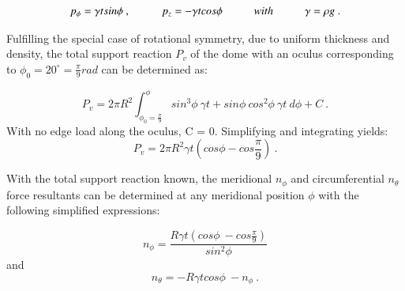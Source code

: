 \begin{equation} 
p_\phi = \gamma t sin\phi\ ,
\hspace{10mm}
p_z = -\gamma t cos\phi
\hspace{10mm}
with
\hspace{10mm}
\gamma = \rho g
\label{eqapp3_1}\ .
\end{equation}

Fulfilling the special case of rotational symmetry, due to uniform thickness and density, the total support reaction $P_v$ of the dome with an oculus corresponding to $\phi_0 = 20^{\circ} = \frac{\pi}{9} rad$ can be determined as:

\begin{equation} 
P_v = 2\pi R^2 \int_{\phi_0 = \frac{\pi}{9}}^{\phi}
sin^3 \phi \ \gamma t + sin \phi \ cos^2 \phi \ \gamma t
\ d\phi + C
\label{eqapp3_2}\ .
\end{equation}
With no edge load along the oculus, C = 0. Simplifying and integrating yields:
\begin{equation} 
P_v = 2\pi R^2 \gamma t (cos\phi - cos \frac{\pi}{9})
\label{eqapp3_3}\ .
\end{equation}

With the total support reaction known, the meridional $n_\phi$ and circumferential $n_\theta$ force resultants can be determined at any meridional position $\phi$ with the following simplified expressions:

\begin{equation} 
n_\phi = \frac{R\gamma t (cos \phi \ - cos\frac{\pi}{9})}{sin^2\phi} 
\label{eqapp3_4}
\end{equation}
and
\begin{equation} 
n_\theta = -R \gamma t cos \phi \ - n_\phi
\label{eqapp3_5}\ .
\end{equation}
